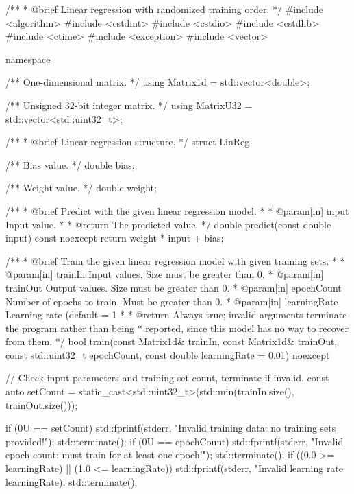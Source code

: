 \begin{cppcode}
/**
 * @brief Linear regression with randomized training order.
 */
#include <algorithm>
#include <cstdint>
#include <cstdio>
#include <cstdlib>
#include <ctime>
#include <exception>
#include <vector>

namespace
{
/** One-dimensional matrix. */
using Matrix1d = std::vector<double>;

/** Unsigned 32-bit integer matrix. */
using MatrixU32 = std::vector<std::uint32_t>;

/**
 * @brief Linear regression structure.
 */
struct LinReg
{
    /** Bias value. */
    double bias;

    /** Weight value. */
    double weight;

    /**
     * @brief Predict with the given linear regression model.
     *
     * @param[in] input Input value.
     *
     * @return The predicted value.
     */
    double predict(const double input) const noexcept { return weight * input + bias; }

    /**
     * @brief Train the given linear regression model with given training sets.
     *
     * @param[in] trainIn Input values. Size must be greater than 0.
     * @param[in] trainOut Output values. Size must be greater than 0.
     * @param[in] epochCount Number of epochs to train. Must be greater than 0.
     * @param[in] learningRate Learning rate (default = 1 %
     *
     * @return Always true; invalid arguments terminate the program rather than being
     *         reported, since this model has no way to recover from them.
     */
    bool train(const Matrix1d& trainIn, const Matrix1d& trainOut,
               const std::uint32_t epochCount, const double learningRate = 0.01) noexcept
    {
        // Check input parameters and training set count, terminate if invalid.
        const auto setCount = static_cast<std::uint32_t>(std::min(trainIn.size(), trainOut.size()));

        if (0U == setCount)
        {
            std::fprintf(stderr, "Invalid training data: no training sets provided!\n");
            std::terminate();
        }
        if (0U == epochCount)
        {
            std::fprintf(stderr, "Invalid epoch count: must train for at least one epoch!\n");
            std::terminate();
        }
        if ((0.0 >= learningRate) || (1.0 <= learningRate))
        {
            std::fprintf(stderr, "Invalid learning rate %
                learningRate);
            std::terminate();
        }

}}}
\end{cppcode}
